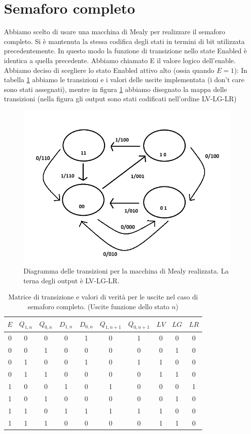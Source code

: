 \documentclass[10pt,a4paper]{article}
\begin{document}
\section{Semaforo completo}
Abbiamo scelto di usare una macchina di Mealy per realizzare il semaforo completo. Si è mantenuta la stessa codifica degli stati in termini di bit utilizzata precedentemente. In questo modo la funzione di transizione nello state Enabled è identica a quella precedente. Abbiamo chiamato E il valore logico dell'enable.
Abbiamo deciso di scegliere lo stato Enabled attivo alto (ossia quando $E = 1$):%
In tabella \ref{tab:semaforocompleto} abbiamo le transizioni e i valori delle uscite implementata (i don't care sono stati assegnati), mentre in figura \ref{fig:FSMcomplete} abbiamo disegnato la mappa delle transizioni (nella figura gli output sono stati codificati nell'ordine LV-LG-LR)
\begin{figure}[!htb]
\centering
\includegraphics[scale=0.7]{FSMcomplete.png}
\caption{Diagramma delle transizioni per la macchina di Mealy realizzata. La terna degli output è LV-LG-LR.\label{fig:FSMcomplete}}
\end{figure}
\begin{table}
\centering
\begin{tabular}{|c||c|c|c|c||c|c||c|c|c|}
\hline
$E$ & $Q_{1,n}$ & $Q_{0, n}$ & $D_{1,n}$ & $D_{0,n}$ & $Q_{1, n+1}$ & $Q_{0, n+1}$ & $LV$ & $LG$ & $LR$\\
\hline
0 & 0 & 0 & 0 & 1 & 0 & 1 & 0 & 0 & 0 \\
0 & 0 & 1 & 0 & 0 & 0 & 0 & 0 & 1 & 0\\
0 & 1 & 0 & 0 & 1 & 0 & 1 & 1 & 0 & 0\\
0 & 1 & 1 & 0 & 0 & 0 & 0 & 1 & 1 & 0\\
\hline
1 & 0 & 0 & 1 & 0 & 1 & 0 & 0 & 0 & 1 \\
1 & 0 & 1 & 0 & 0 & 0 & 0 & 0 & 1 & 0\\
1 & 1 & 0 & 1 & 1 & 1 & 1 & 1 & 0 & 0\\
1 & 1 & 1 & 0 & 0 & 0 & 0 & 1 & 1 & 0\\
\hline
\end{tabular}
\caption{Matrice di transizione e valori di verità per le uscite nel caso di semaforo completo. (Uscite funzione dello stato $n$) \label{tab:semaforocompleto}}
\end{table} 
\end{document}
